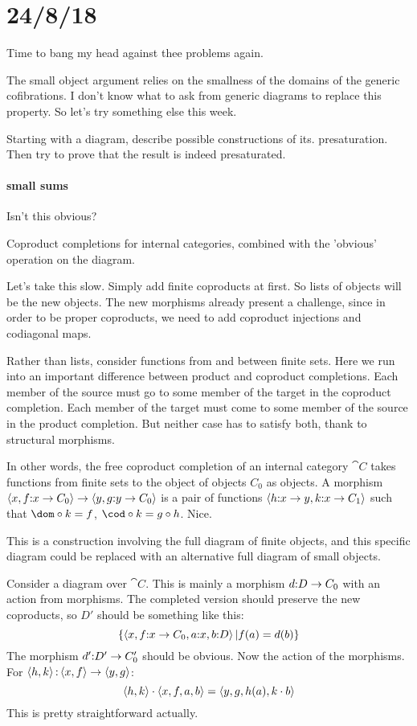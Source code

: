 \documentclass[csh.tex]{subfiles}
\begin{document}
\section{24/8/18}
Time to bang my head against thee problems again.

The small object argument relies on the smallness of the domains of the generic cofibrations. I don't know what to ask from generic diagrams to replace this property. So let's try something else this week.

Starting with a diagram, describe possible constructions of its. presaturation. Then try to prove that the result is indeed presaturated.

\paragraph{small sums}
Isn't this obvious?

Coproduct completions for internal categories, combined with the 'obvious' operation on the diagram.

Let's take this slow. Simply add finite coproducts at first. So lists of objects will be the new objects. The new morphisms already present a challenge, since in order to be proper coproducts, we need to add coproduct injections and codiagonal maps.

Rather than lists, consider functions from and between finite sets. Here we run into an important difference between product and coproduct completions. Each member of the source must go to some member of the target in the coproduct completion. Each member of the target must come to some member of the source in the product completion. But neither case has to satisfy both, thank to structural morphisms.

In other words, the free coproduct completion of an internal category $\cat C$ takes functions from finite sets to the object of objects $C_0$ as objects. A morphism $\left\langle x,f\mathord : x\to C_0 \right\rangle\to\left\langle y,g\mathord : y\to C_0 \right\rangle$ is a pair of functions $\left\langle h\mathord : x\to y,k\mathord : x\to C_1 \right\rangle$ such that $\dom\circ k = f$, $\cod\circ k = g\circ h$. Nice.

This is a construction involving the full diagram of finite objects, and this specific diagram could be replaced with an alternative full diagram of small objects.

Consider a diagram over $\cat C$. This is mainly a morphism $d\mathord : D\to C_0$ with an action from morphisms. 
The completed version should preserve the new coproducts, so $D'$ should be something like this:
\[ \left\{\left\langle x,f\mathord : x\to C_0, a\mathord : x, b\mathord : D \right\rangle| f(a) = d(b) \right\}\]
The morphism $d'\mathord : D'\to C_0'$ should be obvious. Now the action of the morphisms. For $\left\langle h,k \right\rangle\mathord :\left\langle x,f \right\rangle\to\left\langle y,g \right\rangle$:
\[ \left\langle h,k \right\rangle\cdot\left\langle x,f,a,b \right\rangle = \left\langle y,g,h(a),k\cdot b \right\rangle\]
This is pretty straightforward actually.
\end{document}
